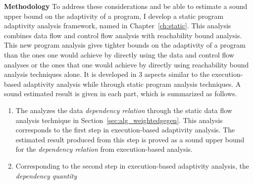 \begin{enumerate}
\textbf{Methodology}
To address these considerations and be able to estimate a sound upper bound on the adaptivity of a program, 
I develop a static program adaptivity analysis framework, named {\THESYSTEM} in Chapter~\ref{ch:static}.
This analysis combines data flow and control flow analysis with reachability bound analysis.
This new program analysis gives tighter bounds on the adaptivity of a program than the ones one would achieve 
by directly using the data and control flow analyses or the ones that one would achieve 
by directly using reachability bound analysis techniques alone. 
It is developed in 3 aspects similar to the execution-based adaptivity analysis 
while through static program analysis techniques. 
A sound estimated result is given in each part, which is summarized as follows.
\begin{enumerate}
\item The {\THESYSTEM} analyzes the data \emph{dependency relation} through the static data flow analysis technique in Section~\ref{sec:alg_weightedgegen}.
This analysis corresponds to the first step in execution-based adaptivity analysis. 
The estimated result produced from 
this step is proved as a sound upper bound for the \emph{dependency relation} from execution-based analysis.
\item 
Corresponding to the second step in execution-based adaptivity analysis, the \emph{dependency quantity} 

\end{enumerate}
\end{enumerate}
